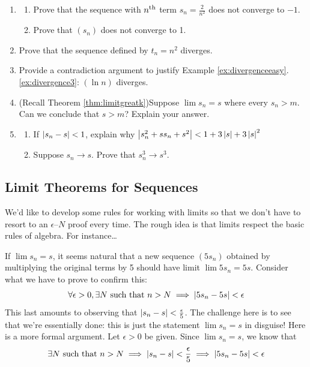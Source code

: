 \begin{exercises}{}{}
\begin{enumerate}
	 	
	  \item\begin{enumerate}
	   	\item Prove that the sequence with $n\textsuperscript{th}$ term $s_n=\frac 2{n^2}$ does not converge to $-1$.
			\item Prove that $(s_n)$ does not converge to 1.
		\end{enumerate}
	    
	  \item Prove that the sequence defined by $t_n=n^2$ diverges.
	  
	 	
	 	\item Provide a contradiction argument to justify Example \ref*{ex:divergenceeasy}.\ref{ex:divergence3}: $(\ln n)$ diverges.
	
			
		\item (Recall Theorem \ref{thm:limitgreatk})\quad Suppose $\lim s_n=s$ where every $s_n>m$. Can we conclude that $s>m$? Explain your answer.
		
		
		\item\begin{enumerate}
			\item If $\left| s_n-s\right|<1$, explain why $\left| s_n^2+ss_n+s^2\right|< 1+3\left| s\right|+3\left| s\right|^2$
			\item Suppose $s_n\to s$. Prove that $s_n^3\to s^3$.  
		\end{enumerate}
		
	\end{enumerate}
\end{exercises}

\clearpage




\subsection{Limit Theorems for Sequences}

We'd like to develop some rules for working with limits so that we don't have to resort to an $\epsilon$--$N$ proof every time. The rough idea is that limits respect the basic rules of algebra. For instance\ldots

\begin{example}{}{}
If $\lim s_n=s$, it seems natural that a new sequence $(5s_n)$ obtained by multiplying the original terms by 5 should have limit $\lim 5s_n=5s$. Consider what we have to prove to confirm this:
\[\forall\epsilon>0, \exists N\text{ such that }n>N\implies \left| 5s_n-5s\right|<\epsilon\]
This last amounts to observing that $\left| s_n-s\right|<\frac\epsilon 5$. The challenge here is to see that we're essentially done: this is just the statement $\lim s_n=s$ in disguise! Here is a more formal argument.\smallbreak
Let $\epsilon>0$ be given. Since $\lim s_n=s$, we know that
\[\exists N\text{ such that }n>N\implies \left| s_n-s\right|<\frac\epsilon 5\implies \left| 5s_n-5s\right|<\epsilon\]
\end{example}

